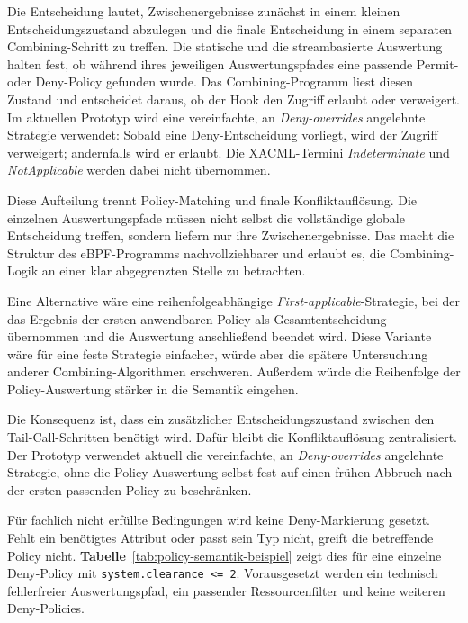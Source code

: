 Die Entscheidung lautet, Zwischenergebnisse zunächst in einem kleinen Entscheidungszustand abzulegen und die finale Entscheidung in einem separaten Combining-Schritt zu treffen.
Die statische und die streambasierte Auswertung halten fest, ob während ihres jeweiligen Auswertungspfades eine passende Permit- oder Deny-Policy gefunden wurde.
Das Combining-Programm liest diesen Zustand und entscheidet daraus, ob der Hook den Zugriff erlaubt oder verweigert.
Im aktuellen Prototyp wird eine vereinfachte, an \textit{Deny-overrides} angelehnte Strategie
verwendet: Sobald eine Deny-Entscheidung vorliegt, wird der Zugriff verweigert; andernfalls wird er
erlaubt. Die XACML-Termini \textit{Indeterminate} und \textit{NotApplicable} werden dabei nicht
übernommen.

Diese Aufteilung trennt Policy-Matching und finale Konfliktauflösung.
Die einzelnen Auswertungspfade müssen nicht selbst die vollständige globale Entscheidung treffen, sondern liefern nur ihre Zwischenergebnisse.
Das macht die Struktur des eBPF-Programms nachvollziehbarer und erlaubt es, die Combining-Logik an einer klar abgegrenzten Stelle zu betrachten.

Eine Alternative wäre eine reihenfolgeabhängige \textit{First-applicable}-Strategie, bei der das
Ergebnis der ersten anwendbaren Policy als Gesamtentscheidung übernommen und die Auswertung
anschließend beendet wird.
Diese Variante wäre für eine feste Strategie einfacher, würde aber die spätere Untersuchung anderer Combining-Algorithmen erschweren.
Außerdem würde die Reihenfolge der Policy-Auswertung stärker in die Semantik eingehen.

Die Konsequenz ist, dass ein zusätzlicher Entscheidungszustand zwischen den Tail-Call-Schritten benötigt wird.
Dafür bleibt die Konfliktauflösung zentralisiert.
Der Prototyp verwendet aktuell die vereinfachte, an \textit{Deny-overrides} angelehnte Strategie,
ohne die Policy-Auswertung selbst fest auf einen frühen Abbruch nach der ersten passenden Policy zu
beschränken.


Für fachlich nicht erfüllte Bedingungen wird keine Deny-Markierung gesetzt. Fehlt ein benötigtes Attribut oder passt sein Typ nicht, greift die betreffende Policy nicht. \textbf{Tabelle}~\ref{tab:policy-semantik-beispiel} zeigt dies für eine einzelne Deny-Policy mit \texttt{system.clearance <= 2}. Vorausgesetzt werden ein technisch fehlerfreier Auswertungspfad, ein passender Ressourcenfilter und keine weiteren Deny-Policies.

